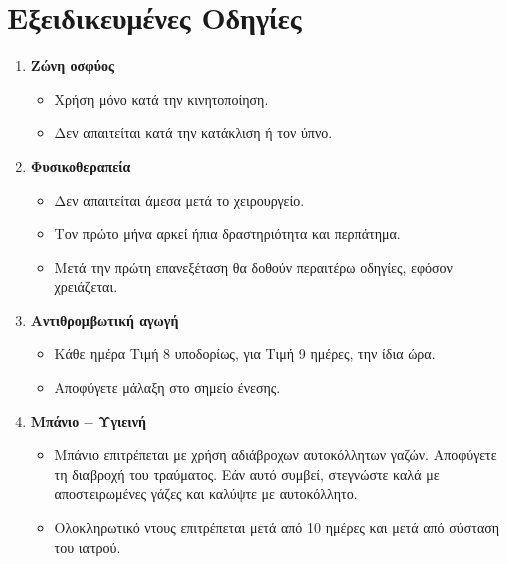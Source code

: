 \documentclass[10pt,greek]{article}
\begin{document}
\section*{Εξειδικευμένες Οδηγίες}
\begin{enumerate}[label=\arabic*.]
  \item \textbf{Ζώνη οσφύος}
      \begin{itemize}
\item Χρήση μόνο κατά την κινητοποίηση.
\item Δεν απαιτείται κατά την κατάκλιση ή τον ύπνο.
    \end{itemize}
  \item \textbf{Φυσικοθεραπεία}
      \begin{itemize}
\item Δεν απαιτείται άμεσα μετά το χειρουργείο.
\item Τον πρώτο μήνα αρκεί ήπια δραστηριότητα και περπάτημα.
\item Μετά την πρώτη επανεξέταση θα δοθούν περαιτέρω οδηγίες, εφόσον χρειάζεται.
    \end{itemize}
  \item \textbf{Αντιθρομβωτική αγωγή}
      \begin{itemize}
\item Κάθε ημέρα Τιμή 8 υποδορίως, για Τιμή 9 ημέρες, την ίδια ώρα.
\item Αποφύγετε μάλαξη στο σημείο ένεσης.
    \end{itemize}
    \item \textbf{Μπάνιο -- Υγιεινή}
        \begin{itemize}
\item Μπάνιο επιτρέπεται με χρήση αδιάβροχων αυτοκόλλητων γαζών. Αποφύγετε τη διαβροχή του τραύματος. Εάν αυτό συμβεί, στεγνώστε καλά με αποστειρωμένες γάζες και καλύψτε με αυτοκόλλητο.
\item Ολοκληρωτικό ντους επιτρέπεται μετά από 10 ημέρες και μετά από σύσταση του ιατρού.
        \end{itemize}
\end{enumerate}
\end{document}
